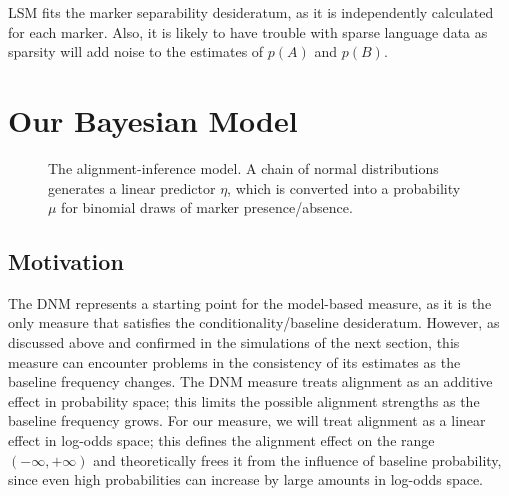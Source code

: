 \documentclass{acm_proc_article-sp}
\begin{document}
LSM fits the marker separability desideratum, as it is independently calculated for each marker. Also, it is likely to have trouble with sparse language data as sparsity will add noise to the estimates of $p(A)$ and $p(B)$.





\section{Our Bayesian Model}

\begin{figure}
  \begin{center}
    
  \end{center}
  \caption{The alignment-inference model. A chain of normal distributions generates a linear predictor $\eta$, which is converted into a probability $\mu$ for binomial draws of marker presence/absence.}\label{fig:model}
\end{figure}

\subsection{Motivation}
The DNM represents a starting point for the model-based measure, as it is the only measure that satisfies the conditionality/baseline desideratum. However, as discussed above and confirmed in the simulations of the next section, this measure can encounter problems in the consistency of its estimates as the baseline frequency changes.  The DNM measure treats alignment as an additive effect in probability space; this limits the possible alignment strengths as the baseline frequency grows.  For our measure, we will treat alignment as a linear effect in log-odds space; this defines the alignment effect on the range $(-\infty,+\infty)$ and theoretically frees it from the influence of baseline probability, since even high probabilities can increase by large amounts in log-odds space.
\end{document}
